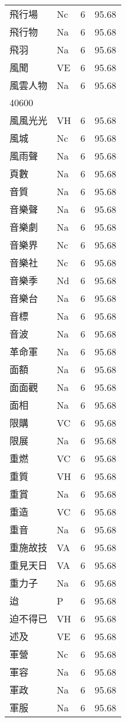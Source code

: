 \documentclass[twocolumn]{book}
\begin{document}
\begin{supertabular}{llrr}
飛行場 & Nc & 6 &  95.68\\
飛行物 & Na & 6 &  95.68\\
飛羽 & Na & 6 &  95.68\\
風聞 & VE & 6 &  95.68\\
風雲人物 & Na & 6 &  95.68\\
40600\\
風風光光 & VH & 6 &  95.68\\
風城 & Nc & 6 &  95.68\\
風雨聲 & Na & 6 &  95.68\\
頁數 & Na & 6 &  95.68\\
音質 & Na & 6 &  95.68\\
音樂聲 & Na & 6 &  95.68\\
音樂劇 & Na & 6 &  95.68\\
音樂界 & Nc & 6 &  95.68\\
音樂社 & Nc & 6 &  95.68\\
音樂季 & Nd & 6 &  95.68\\
音樂台 & Na & 6 &  95.68\\
音標 & Na & 6 &  95.68\\
音波 & Na & 6 &  95.68\\
革命軍 & Na & 6 &  95.68\\
面額 & Na & 6 &  95.68\\
面面觀 & Na & 6 &  95.68\\
面相 & Na & 6 &  95.68\\
限購 & VC & 6 &  95.68\\
限展 & Na & 6 &  95.68\\
重燃 & VC & 6 &  95.68\\
重質 & VH & 6 &  95.68\\
重賞 & Na & 6 &  95.68\\
重造 & VC & 6 &  95.68\\
重音 & Na & 6 &  95.68\\
重施故技 & VA & 6 &  95.68\\
重見天日 & VA & 6 &  95.68\\
重力子 & Na & 6 &  95.68\\
迨 & P & 6 &  95.68\\
迫不得已 & VH & 6 &  95.68\\
述及 & VE & 6 &  95.68\\
軍營 & Nc & 6 &  95.68\\
軍容 & Na & 6 &  95.68\\
軍政 & Na & 6 &  95.68\\
軍服 & Na & 6 &  95.68\\

\end{supertabular}
\end{document}
